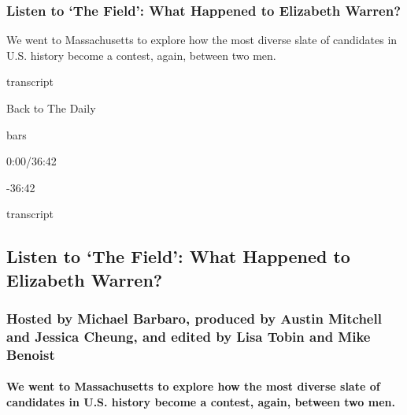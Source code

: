 \hypertarget{listen-to-the-field-what-happened-to-elizabeth-warren}{%
\subsubsection{Listen to `The Field': What Happened to Elizabeth
Warren?}\label{listen-to-the-field-what-happened-to-elizabeth-warren}}

We went to Massachusetts to explore how the most diverse slate of
candidates in U.S. history become a contest, again, between two men.

transcript

Back to The Daily

bars

0:00/36:42

-36:42

transcript

\hypertarget{listen-to-the-field-what-happened-to-elizabeth-warren-1}{%
\subsection{Listen to `The Field': What Happened to Elizabeth
Warren?}\label{listen-to-the-field-what-happened-to-elizabeth-warren-1}}

\hypertarget{hosted-by-michael-barbaro-produced-by-austin-mitchell-and-jessica-cheung-and-edited-by-lisa-tobin-and-mike-benoist}{%
\subsubsection{Hosted by Michael Barbaro, produced by Austin Mitchell
and Jessica Cheung, and edited by Lisa Tobin and Mike
Benoist}\label{hosted-by-michael-barbaro-produced-by-austin-mitchell-and-jessica-cheung-and-edited-by-lisa-tobin-and-mike-benoist}}

\hypertarget{we-went-to-massachusetts-to-explore-how-the-most-diverse-slate-of-candidates-in-us-history-become-a-contest-again-between-two-men}{%
\paragraph{We went to Massachusetts to explore how the most diverse
slate of candidates in U.S. history become a contest, again, between two
men.}\label{we-went-to-massachusetts-to-explore-how-the-most-diverse-slate-of-candidates-in-us-history-become-a-contest-again-between-two-men}}

